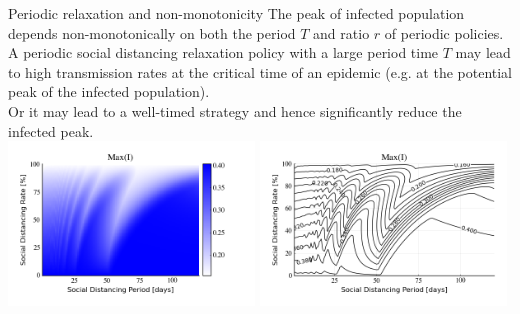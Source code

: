\documentclass[10pt]{beamer}
\begin{document}
\begin{frame}{Periodic relaxation and non-monotonicity}
	The peak of infected population depends non-monotonically on both the period $T$ and ratio $r$ of periodic policies. \\ \vspace{0.5cm}
	A periodic social distancing relaxation policy with a large period time $T$ may lead to high transmission rates at the critical time of an epidemic (e.g. at the potential peak of the infected population).  \\ \vspace{0.5cm}
	Or it may lead to a well-timed strategy and hence significantly reduce the infected peak. \\ \vspace{0.5cm}
	\includegraphics[width=0.49\textwidth]{epidemic-periodic-heatmap.png}
	\includegraphics[width=0.49\textwidth]{epidemic-periodic-contour.png} 
\end{frame}
\end{document}
